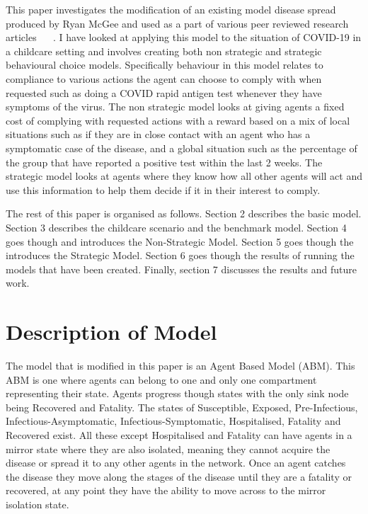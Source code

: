\documentclass{article}
\begin{document}
This paper investigates the modification of an existing model disease spread produced by Ryan McGee and used as a part of various peer reviewed research articles ~\cite{mcgee_homburger_williams_bergstrom_zhou_2021} ~\cite{mcgee_homburger_williams_bergstrom_zhou_2021_2}. 
I have looked at applying this model to the situation of COVID-19 in a childcare setting and involves creating both non strategic and strategic behavioural choice models. Specifically behaviour in this model relates to compliance to various actions the agent can choose to comply with when requested such as doing a COVID rapid antigen test whenever they have symptoms of the virus. The non strategic model looks at giving agents a fixed cost of complying with requested actions with a reward based on a mix of local situations such as if they are in close contact with an agent who has a symptomatic case of the disease, and a global situation such as the percentage of the group that have reported a positive test within the last 2 weeks. The strategic model looks at agents where they know how all other agents will act and use this information to help them decide if it in their interest to comply.\newline

The rest of this paper is organised as follows. Section 2 describes the basic model. Section 3 describes the childcare scenario and the benchmark model. Section 4 goes though and introduces the Non-Strategic Model. Section 5 goes though the introduces the Strategic Model. Section 6 goes though the results of running the models that have been created. Finally, section 7 discusses the results and future work.


\section{Description of Model \label{description}}
The model that is modified in this paper is an Agent Based Model (ABM). This ABM is one where agents can belong to one and only one compartment representing their state. Agents progress though states with the only sink node being Recovered and Fatality. The states of Susceptible, Exposed, Pre-Infectious, Infectious-Asymptomatic, Infectious-Symptomatic, Hospitalised, Fatality and Recovered exist. All these except Hospitalised and Fatality can have agents in a mirror state where they are also isolated, meaning they cannot acquire the disease or spread it to any other agents in the network. Once an agent catches the disease they move along the stages of the disease until they are a fatality or recovered, at any point they have the ability to move across to the mirror isolation state. 
\end{document}
